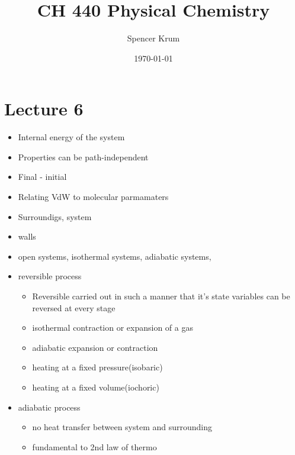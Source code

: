 \documentclass{article}
\title{CH 440 Physical Chemistry}
\author{Spencer Krum}
\date{\today}
\begin{document}
\maketitle

\section{Lecture 6}
\begin{itemize}
    \item Internal energy of the system
    \item Properties can be path-independent
    \item Final - initial
    \item Relating VdW to molecular parmamaters
    \item Surroundigs, system
    \item walls
    \item open systems, isothermal systems, adiabatic systems, 
    \item reversible process
    \begin{itemize}
        \item Reversible carried out in such a manner that it's state variables can be reversed at every stage
        \item isothermal contraction or expansion of a gas
        \item adiabatic expansion or contraction
        \item heating at a fixed pressure(isobaric)
        \item heating at a fixed volume(iochoric)
    \end{itemize}
    \item adiabatic process
    \begin{itemize}
        \item no heat transfer between system and surrounding
        \item fundamental to 2nd law of thermo
    \end{itemize}
\end{itemize}
\end{document}
